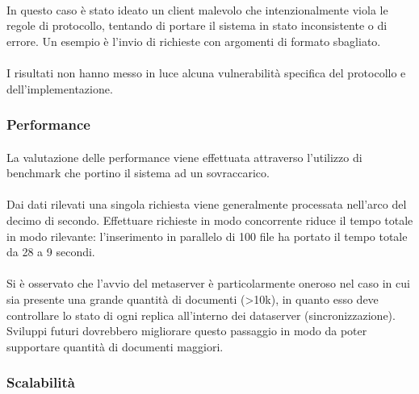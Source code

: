 \documentclass[11pt,a4paper,english]{article}
\begin{document}
\paragraph{} In questo caso è stato ideato un client malevolo che intenzionalmente viola le regole di protocollo, tentando di portare il sistema in stato inconsistente o di errore. Un esempio è l'invio di richieste con argomenti di formato sbagliato.

\paragraph{} I risultati non hanno messo in luce alcuna vulnerabilità specifica del protocollo e dell'implementazione. 

\subsubsection{Performance} 

\paragraph{} La valutazione delle performance viene effettuata attraverso l'utilizzo di benchmark che portino il sistema ad un sovraccarico. 

\paragraph{} Dai dati rilevati una singola richiesta viene generalmente processata nell'arco del decimo di secondo. Effettuare richieste in modo concorrente riduce il tempo totale in modo rilevante: l'inserimento in parallelo di 100 file ha portato il tempo totale da 28 a 9 secondi. 

\paragraph{} Si è osservato che l'avvio del metaserver è particolarmente oneroso nel caso in cui sia presente una grande quantità di documenti (>10k), in quanto esso deve controllare lo stato di ogni replica all'interno dei dataserver (sincronizzazione). Sviluppi futuri dovrebbero migliorare questo passaggio in modo da poter supportare quantità di documenti maggiori. 

\subsubsection{Scalabilità}
\end{document}
